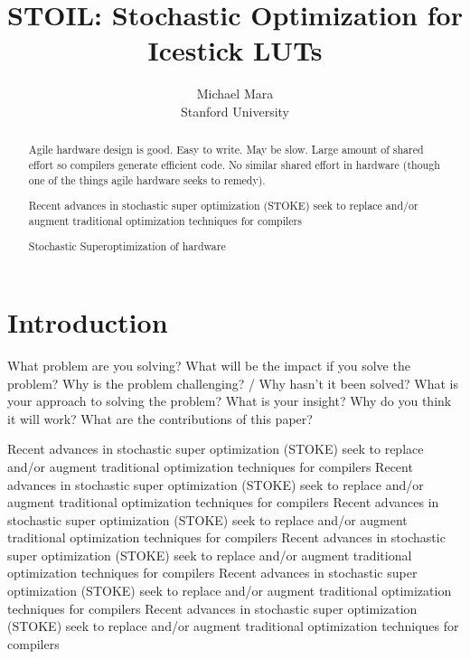 \documentclass{article}
\begin{document}
\title{STOIL: Stochastic Optimization for Icestick LUTs}

\author
       {Michael Mara\\Stanford University}



\maketitle

\begin{abstract}
\small
Agile hardware design is good.
Easy to write.
May be slow.
Large amount of shared effort so compilers generate efficient code.
No similar shared effort in hardware (though one of the things agile hardware seeks to remedy).

Recent advances in stochastic super optimization (STOKE) seek to replace and/or augment traditional optimization techniques for compilers

Stochastic Superoptimization of hardware
\end{abstract}


\section{Introduction}
What problem are you solving?
What will be the impact if you solve the problem?
Why is the problem challenging? / Why hasn't it
been solved?
What is your approach to solving the problem?
What is your insight? Why do you think it will
work?
What are the contributions of this paper?

Recent advances in stochastic super optimization (STOKE) seek to replace and/or augment traditional optimization techniques for compilers
Recent advances in stochastic super optimization (STOKE) seek to replace and/or augment traditional optimization techniques for compilers
Recent advances in stochastic super optimization (STOKE) seek to replace and/or augment traditional optimization techniques for compilers
Recent advances in stochastic super optimization (STOKE) seek to replace and/or augment traditional optimization techniques for compilers
Recent advances in stochastic super optimization (STOKE) seek to replace and/or augment traditional optimization techniques for compilers
Recent advances in stochastic super optimization (STOKE) seek to replace and/or augment traditional optimization techniques for compilers
\end{document}
